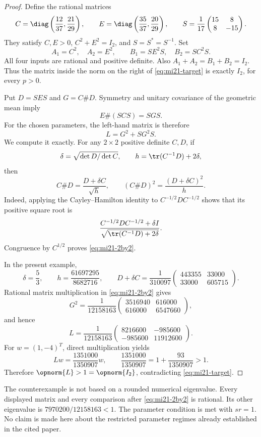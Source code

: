 \begin{proof}
Define the rational matrices
\[
 C=\diag\left(\frac{12}{37},\frac{21}{29}\right),\qquad
 E=\diag\left(\frac{35}{37},\frac{20}{29}\right),\qquad
 S=\frac1{17}\begin{pmatrix}15&8\\8&-15\end{pmatrix}.
\]
They satisfy $C,E>0$, $C^2+E^2=I_2$, and $S=S^*=S^{-1}$. Set
\[
 A_1=C^2,\quad A_2=E^2,\qquad
 B_1=SE^2S,\quad B_2=SC^2S.
\]
All four inputs are rational and positive definite. Also
$A_1+A_2=B_1+B_2=I_2$. Thus the matrix inside the norm on the right of \eqref{eq:mi21-target} is exactly $I_2$, for every $p>0$.

Put $D=SES$ and $G=C\#D$. Symmetry and unitary covariance of the geometric mean imply
\[
 E\#(SCS)=SGS.
\]
For the chosen parameters, the left-hand matrix is therefore
\[
 L=G^2+SG^2S.
\]
We compute it exactly. For any $2\times2$ positive definite $C,D$, if
\[
 \delta=\sqrt{\det D/\det C},\qquad h=\tr(C^{-1}D)+2\delta,
\]
then
\begin{equation}\label{eq:mi21-2by2}
 C\#D=\frac{D+\delta C}{\sqrt h},\qquad
 (C\#D)^2=\frac{(D+\delta C)^2}{h}.
\end{equation}
Indeed, applying the Cayley--Hamilton identity to $C^{-1/2}DC^{-1/2}$ shows that its positive square root is
\[
 \frac{C^{-1/2}DC^{-1/2}+\delta I}{\sqrt{\tr(C^{-1}D)+2\delta}}.
\]
Congruence by $C^{1/2}$ proves \eqref{eq:mi21-2by2}.

In the present example,
\[
 \delta=\frac53,\qquad
 h=\frac{61697295}{8682716},\qquad
 D+\delta C=\frac1{310097}
 \begin{pmatrix}443355&33000\\33000&605715\end{pmatrix}.
\]
Rational matrix multiplication in \eqref{eq:mi21-2by2} gives
\[
 G^2=\frac1{12158163}
 \begin{pmatrix}3516940&616000\\616000&6547660\end{pmatrix},
\]
and hence
\begin{equation}\label{eq:mi21-L}
 L=\frac1{12158163}
 \begin{pmatrix}8216600&-985600\\-985600&11912600\end{pmatrix}.
\end{equation}
For $w=(1,-4)^T$, direct multiplication yields
\[
 Lw=\frac{1351000}{1350907}w,
 \qquad\frac{1351000}{1350907}=1+\frac{93}{1350907}>1.
\]
Therefore $\opnorm{L}>1=\opnorm{I_2}$, contradicting \eqref{eq:mi21-target}.
\end{proof}

\begin{remark}
The counterexample is not based on a rounded numerical eigenvalue. Every displayed matrix and every comparison after \eqref{eq:mi21-2by2} is rational. Its other eigenvalue is $7970200/12158163<1$. The parameter condition is met with $sr=1$. No claim is made here about the restricted parameter regimes already established in the cited paper.
\end{remark}
